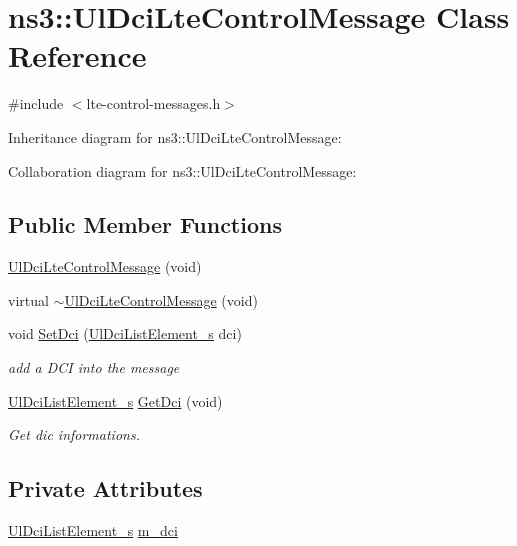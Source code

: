 \hypertarget{classns3_1_1UlDciLteControlMessage}{}\section{ns3\+:\+:Ul\+Dci\+Lte\+Control\+Message Class Reference}
\label{classns3_1_1UlDciLteControlMessage}


{\ttfamily \#include $<$lte-\/control-\/messages.\+h$>$}



Inheritance diagram for ns3\+:\+:Ul\+Dci\+Lte\+Control\+Message\+:


Collaboration diagram for ns3\+:\+:Ul\+Dci\+Lte\+Control\+Message\+:
\subsection*{Public Member Functions}
\begin{DoxyCompactItemize}
\item 
\hyperlink{classns3_1_1UlDciLteControlMessage_a9730965620992fa528d59a1262174c89}{Ul\+Dci\+Lte\+Control\+Message} (void)
\item 
virtual \hyperlink{classns3_1_1UlDciLteControlMessage_ae35802d0a9077675404f35584327ea1e}{$\sim$\+Ul\+Dci\+Lte\+Control\+Message} (void)
\item 
void \hyperlink{classns3_1_1UlDciLteControlMessage_a1b373b295b642e9a5a381b6a36d08210}{Set\+Dci} (\hyperlink{structns3_1_1UlDciListElement__s}{Ul\+Dci\+List\+Element\+\_\+s} dci)
\begin{DoxyCompactList}\small\item\em add a D\+CI into the message \end{DoxyCompactList}\item 
\hyperlink{structns3_1_1UlDciListElement__s}{Ul\+Dci\+List\+Element\+\_\+s} \hyperlink{classns3_1_1UlDciLteControlMessage_a73bd48141115bd66ddea884173c51a68}{Get\+Dci} (void)
\begin{DoxyCompactList}\small\item\em Get dic informations. \end{DoxyCompactList}\end{DoxyCompactItemize}
\subsection*{Private Attributes}
\begin{DoxyCompactItemize}
\item 
\hyperlink{structns3_1_1UlDciListElement__s}{Ul\+Dci\+List\+Element\+\_\+s} \hyperlink{classns3_1_1UlDciLteControlMessage_ad7bdba8fe5c0a89de2d80958ddb88209}{m\+\_\+dci}
\end{DoxyCompactItemize}
